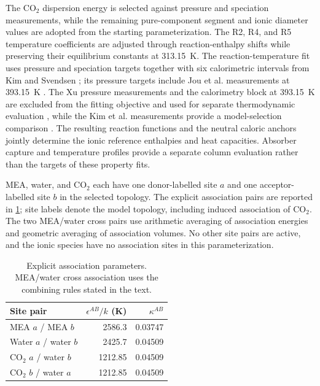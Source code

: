 The CO$_2$ dispersion energy is selected against pressure and speciation measurements, while the remaining pure-component segment and ionic diameter values are adopted from the starting parameterization.
The R2, R4, and R5 temperature coefficients are adjusted through reaction-enthalpy shifts while preserving their equilibrium constants at \qty{313.15}{K}.
The reaction-temperature fit uses pressure and speciation targets together with six calorimetric intervals from Kim and Svendsen \cite{Kim2007}; its pressure targets include Jou et al. measurements at \qty{393.15}{K} \cite{Jou1995}.
The Xu pressure measurements and the calorimetry block at \qty{393.15}{K} are excluded from the fitting objective and used for separate thermodynamic evaluation \cite{Xu2011,Kim2007}, while the Kim et al. measurements provide a model-selection comparison \cite{Kim2014}.
The resulting reaction functions and the neutral caloric anchors jointly determine the ionic reference enthalpies and heat capacities.
Absorber capture and temperature profiles provide a separate column evaluation rather than the targets of these property fits.

MEA, water, and CO$_2$ each have one donor-labelled site $a$ and one acceptor-labelled site $b$ in the selected topology.
The explicit association pairs are reported in \cref{tab:reactive-association}; site labels denote the model topology, including induced association of CO$_2$.
The two MEA/water cross pairs use arithmetic averaging of association energies and geometric averaging of association volumes.
No other site pairs are active, and the ionic species have no association sites in this parameterization.

\begin{table}[pos=htbp]
\centering\small
\caption{Explicit association parameters. MEA/water cross association uses the combining rules stated in the text.}
\label{tab:reactive-association}
\begin{tabular}{@{}lrr@{}}
\toprule
Site pair & $\epsilon^{AB}/k$ (K) & $\kappa^{AB}$\\
\midrule
MEA $a$ / MEA $b$ & 2586.3 & 0.03747\\
Water $a$ / water $b$ & 2425.7 & 0.04509\\
CO$_2$ $a$ / water $b$ & 1212.85 & 0.04509\\
CO$_2$ $b$ / water $a$ & 1212.85 & 0.04509\\
\bottomrule
\end{tabular}
\end{table}

